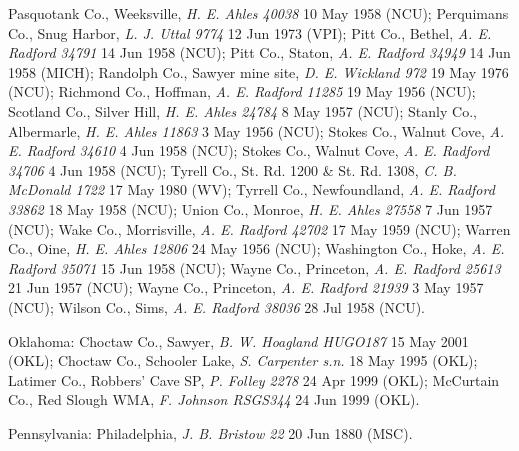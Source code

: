 \documentclass{article}
\begin{document}
Pasquotank Co., Weeksville, \textit{H. E. Ahles 40038} 10 May 1958 (NCU);
Perquimans Co., Snug Harbor, \textit{L. J. Uttal 9774} 12 Jun 1973 (VPI);
Pitt Co., Bethel, \textit{A. E. Radford 34791} 14 Jun 1958 (NCU);
Pitt Co., Staton, \textit{A. E. Radford 34949} 14 Jun 1958 (MICH);
Randolph Co., Sawyer mine site, \textit{D. E. Wickland 972} 19 May 1976 (NCU);
Richmond Co., Hoffman, \textit{A. E. Radford 11285} 19 May 1956 (NCU);
Scotland Co., Silver Hill, \textit{H. E. Ahles 24784} 8 May 1957 (NCU);
Stanly Co., Albermarle, \textit{H. E. Ahles 11863} 3 May 1956 (NCU);
Stokes Co., Walnut Cove, \textit{A. E. Radford 34610} 4 Jun 1958 (NCU);
Stokes Co., Walnut Cove, \textit{A. E. Radford 34706} 4 Jun 1958 (NCU);
Tyrell Co., St. Rd. 1200 \& St. Rd. 1308, \textit{C. B. McDonald 1722} 17 May 1980 (WV);
Tyrrell Co., Newfoundland, \textit{A. E. Radford 33862} 18 May 1958 (NCU);
Union Co., Monroe, \textit{H. E. Ahles 27558} 7 Jun 1957 (NCU);
Wake Co., Morrisville, \textit{A. E. Radford 42702} 17 May 1959 (NCU);
Warren Co., Oine, \textit{H. E. Ahles 12806} 24 May 1956 (NCU);
Washington Co., Hoke, \textit{A. E. Radford 35071} 15 Jun 1958 (NCU);
Wayne Co., Princeton, \textit{A. E. Radford 25613} 21 Jun 1957 (NCU);
Wayne Co., Princeton, \textit{A. E. Radford 21939} 3 May 1957 (NCU);
Wilson Co., Sims, \textit{A. E. Radford 38036} 28 Jul 1958 (NCU).

Oklahoma:
Choctaw Co., Sawyer, \textit{B. W. Hoagland HUGO187} 15 May 2001 (OKL);
Choctaw Co., Schooler Lake, \textit{S. Carpenter s.n.} 18 May 1995 (OKL);
Latimer Co., Robbers' Cave SP, \textit{P. Folley 2278} 24 Apr 1999 (OKL);
McCurtain Co., Red Slough WMA, \textit{F. Johnson RSGS344} 24 Jun 1999 (OKL).

Pennsylvania:
Philadelphia, \textit{J. B. Bristow 22} 20 Jun 1880 (MSC).
\end{document}
